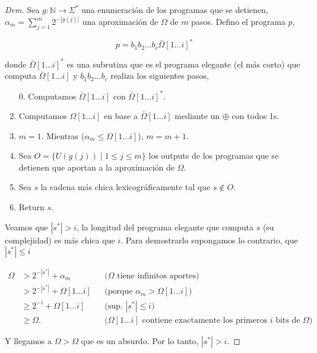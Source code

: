 \documentclass{article}
\theoremstyle{definition} %
\newcommand{\first}[2]{#2[1 \dots #1]}
\begin{document}
\begin{proof}[Dem]
    Sea $g: \mathbb{N} \to \Sigma^*$ una enumeración de los programas que se
    detienen, $\alpha_m = \sum_{j = 1}^{m} 2 ^ {-|g(j)|}$ una aproximación de
    $\Omega$ de $m$ pasos. Defino el programa $p$,

    \[
        p = b_1 b_2 \dots b_c \first{i}{\bar{\Omega}}^*
    \]

    donde $\first{i}{\bar{\Omega}}^*$ es una subrutina que es el programa
    elegante (el más corto) que computa $\first{i}{\bar{\Omega}}$ y $b_1 b_2
    \dots b_c$ realiza los siguientes pasos,

    \begin{enumerate}
        \item[0.] Computamos $\first{i}{\bar{\Omega}}$ con
        $\first{i}{\bar{\Omega}}^*$.
        \item Computamos $\first{i}{\Omega}$ en base a
        $\first{i}{\bar{\Omega}}$ mediante un $\oplus$ con todos 1s.
        \item $m = 1$. Mientras ($\alpha_m \leq \first{i}{\Omega}$), $m = m + 1$.
        \item Sea $O = \{ U(g(j)) \mid 1 \leq j \leq m \}$ los outputs de los
        programas que se detienen que aportan a la aproximación de $\Omega$.
        \item Sea $s$ la cadena más chica lexicográficamente tal que $s \notin O$.
        \item Return $s$.
    \end{enumerate}

    Veamos que $|s^*| > i$, la longitud del programa elegante que computa $s$
    (su complejidad) es más chica que $i$. Para demostrarlo supongamos lo
    contrario, que $|s^*| \leq i$

    \begin{align*}
        \Omega 
        &> 2^{-|s^*|} + \alpha_m
            &&\text{($\Omega$ tiene infinitos aportes)}\\
        &> 2^{-|s^*|} + \first{i}{\Omega}
            &&\text{(porque $\alpha_m > \first{i}{\Omega}$)}\\
        &\geq 2^{-i} + \first{i}{\Omega}
            &&\text{(sup. $|s^*| \leq i$)}\\
        &\geq \Omega.
            &&\text{($\first{i}{\Omega}$ contiene exactamente los primeros $i$ bits de $\Omega$)}
    \end{align*}

    Y llegamos a $\Omega > \Omega$ que es un absurdo. Por lo tanto, $|s^*| > i$.
    

\end{proof}
\end{document}
